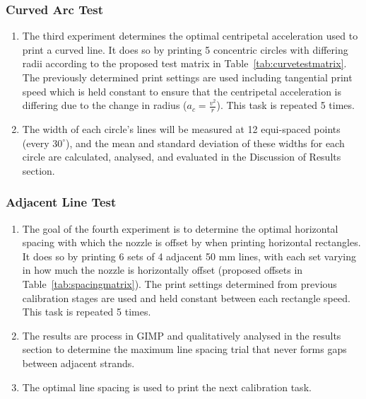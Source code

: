 \subsubsection*{Curved Arc Test}
\begin{enumerate}
    \item The third experiment determines the optimal centripetal acceleration used to print a curved line. It does so by printing 5 concentric circles with differing radii according to the proposed test matrix in Table~\ref{tab:curvetestmatrix}. The previously determined print settings are used including tangential print speed which is held constant to ensure that the centripetal acceleration is differing due to the change in radius ($a_c=\frac{v^2}{r}$). This task is repeated 5 times.
    \item The width of each circle's lines will be measured at 12 equi-spaced points (every $30^\circ$), and the mean and standard deviation of these widths for each circle are calculated, analysed, and evaluated in the Discussion of Results section.
\end{enumerate}

\subsubsection*{Adjacent Line Test}
\begin{enumerate}
    \item The goal of the fourth experiment is to determine the optimal horizontal spacing with which the nozzle is offset by when printing horizontal rectangles. It does so by printing 6 sets of 4 adjacent 50 mm lines, with each set varying in how much the nozzle is horizontally offset (proposed offsets in Table~\ref{tab:spacingmatrix}). The print settings determined from previous calibration stages are used and held constant between each rectangle speed. This task is repeated 5 times.
    \item The results are process in GIMP and qualitatively analysed in the results section to determine the maximum line spacing trial that never forms gaps between  adjacent strands.
    \item The optimal line spacing is used to print the next calibration task.
\end{enumerate}

